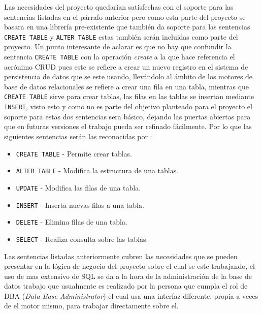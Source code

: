 Las necesidades del proyecto quedarían satisfechas con el soporte para las sentencias listadas en el párrafo anterior pero como esta parte del proyecto se basara en una librería pre-existente que también da soporte para las sentencias \verb=CREATE TABLE= y \verb=ALTER TABLE= estas también serán incluidas como parte del proyecto. Un punto interesante de aclarar es que no hay que confundir la sentencia \verb=CREATE TABLE= con la operación \textit{create} a la que hace referencia el acrónimo CRUD pues este se refiere a crear un nuevo registro en el sistema de persistencia de datos que se este usando, llevándolo al ámbito de los motores de base de datos relacionales se refiere a crear una fila en una tabla, mientras que \verb=CREATE TABLE= sirve para crear tablas, las filas en las tablas se insertan mediante \verb=INSERT=, visto esto y como no es parte del objetivo planteado para el proyecto el soporte para estas dos sentencias sera básico, dejando las puertas abiertas para que en futuras versiones el trabajo pueda ser refinado fácilmente. Por lo que las siguientes sentencias serán las reconocidas por \jj:
%
\begin{itemize}
\item \verb=CREATE TABLE= - Permite crear tablas. 
\item \verb=ALTER TABLE= - Modifica la estructura de una tablas.
\item \verb=UPDATE= - Modifica las filas de una tabla.
\item \verb=INSERT= - Inserta nuevas filas a una tabla.
\item \verb=DELETE= - Elimina filas de una tabla.
\item \verb=SELECT= - Realiza consulta sobre las tablas.
\end{itemize}
%
%
Las sentencias listadas anteriormente cubren las necesidades que se pueden presentar en la lógica de negocio del proyecto sobre el cual se este trabajando, el uso de mas extensivo de SQL se da a la hora de la administración de la base de datos trabajo que usualmente es realizado por la persona que cumpla el rol de DBA (\textit{Data Base Administrator}) el cual usa una interfaz diferente, propia a veces de el motor mismo, para trabajar directamente sobre el.

